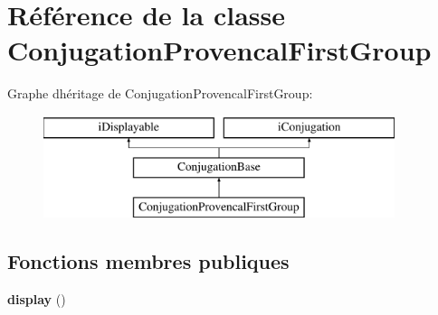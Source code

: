 \hypertarget{classConjugationProvencalFirstGroup}{}\section{Référence de la classe Conjugation\+Provencal\+First\+Group}
\label{classConjugationProvencalFirstGroup}
Graphe d\textquotesingle{}héritage de Conjugation\+Provencal\+First\+Group\+:\begin{figure}[H]
\begin{center}
\leavevmode
\includegraphics[height=3.000000cm]{classConjugationProvencalFirstGroup}
\end{center}
\end{figure}
\subsection*{Fonctions membres publiques}
\begin{DoxyCompactItemize}
\item 
\hypertarget{classConjugationProvencalFirstGroup_a6bd7d4bb8434586bf0ac5836a51d0022}{}\label{classConjugationProvencalFirstGroup_a6bd7d4bb8434586bf0ac5836a51d0022} 
{\bfseries display} ()
\end{DoxyCompactItemize}

